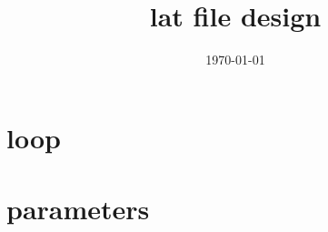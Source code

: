 \documentclass[10pt,CCT]{ctexart}
\begin{document}
\title{lat file design}
 \date{\today}%

\maketitle
\thispagestyle{empty}


\section{loop}


\section{parameters}
\end{document}

